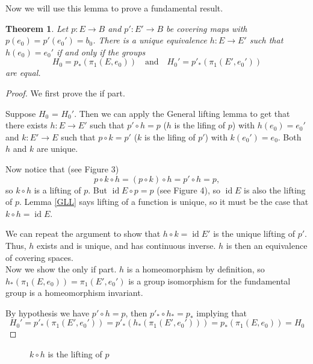 \documentclass{amsart}
\newtheorem{theorem}{Theorem}[section]
\theoremstyle{definition}
\theoremstyle{remark}
\numberwithin{equation}{section}
\begin{document}
Now we will use this lemma to prove a fundamental result.

\begin{theorem} Let $p : E \to B$ and $p' : E' \to B$ be covering maps with $p(e_0) = p'(e_0') = b_0$. There is a unique equivalence $h : E \to E'$ such that $h(e_0) = e_0'$ if and only if the groups
\[
H_0 = p_\ast(\pi_1(E, e_0)) \quad \text{and} \quad H_0' = p'_\ast(\pi_1(E', e_0'))
\]
are equal.
\end{theorem}

\begin{proof}
    We first prove the if part.

    Suppose $H_0$ = $H_0'$. Then we can apply the General lifting lemma to get that there exists $h: E \rightarrow E'$ such that $p' \circ h = p$ ($h$ is the lifing of $p$) with $h(e_0) = e_0'$ and $k: E' \rightarrow E$ such that $p \circ k = p'$ ($k$ is the lifing of $p'$) with $k(e_0') = e_0$. Both $h$ and $k$ are unique.

    Now notice that (see Figure 3)
    $$ p \circ k\circ h = (p \circ k) \circ h = p' \circ h = p,$$
    so $k \circ h$ is a lifting of $p$. But $\operatorname{id}E \circ p = p$ (see Figure 4), so $\operatorname{id}E$ is also the lifting of $p$. Lemma \ref{GLL} says lifting of a function is unique, so it must be the case that $k \circ h = \operatorname{id}E$.

    We can repeat the argument to show that $h \circ k = \operatorname{id} E'$ is the unique lifting of $p'$. Thus, $h$ exists and is unique, and has continuous inverse. $h$ is then an equivalence of covering spaces.
    $$$$
    Now we show the only if part. $h$ is a homeomorphism by definition, so $h_\ast(\pi_1(E, e_0)) = \pi_1(E', e_0')$ is a group isomorphism for the fundamental group is a homeomorphism invariant.

    By hypothesis we have $p' \circ h = p$, then $p'_\ast \circ h_\ast = p_\ast$ implying that 
    $$H_0' = p'_\ast(\pi_1(E', e_0')) = p'_\ast(h_\ast(\pi_1(E', e_0'))) = p_\ast(\pi_1(E, e_0)) = H_0$$
\end{proof}

\begin{figure}
    \centering
    \caption{$k\circ h$ is the lifting of $p$}
\end{figure}
\end{document}
